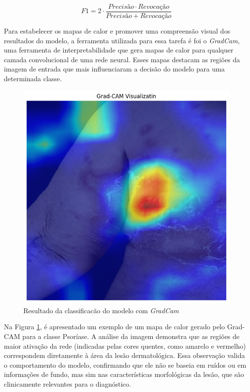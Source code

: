 \begin{equation}
  F1 = 2 \cdot \frac{Precisão \cdot Revocação}{Precisão + Revocação}
  \label{eq:f1_score}
\end{equation}

Para estabelecer os mapas de calor e promover uma compreensão visual dos resultados do modelo, a ferramenta utilizada para essa tarefa é foi o \textit{GradCam}, uma ferramenta de interpretabilidade que gera mapas de calor para qualquer camada convolucional de uma rede neural. Esses mapas destacam as regiões da imagem de entrada que mais influenciaram a decisão do modelo para uma determinada classe.


\begin{figure}[h]
  \begin{center}
    \includegraphics[scale=0.4]{images/test1-compesos.png}
  \end{center}
  \caption{Resultado da classificacão do modelo com \textit{GradCam}}
  \label{fig:gradcam}
\end{figure}


Na Figura \ref{fig:gradcam}, é apresentado um exemplo de um mapa de calor gerado pelo Grad-CAM para a classe Psoríase. A análise da imagem demonstra que as regiões de maior ativação da rede (indicadas pelas cores quentes, como amarelo e vermelho) correspondem diretamente à área da lesão dermatológica. Essa observação valida o comportamento do modelo, confirmando que ele não se baseia em ruídos ou em informações de fundo, mas sim nas características morfológicas da lesão, que são clinicamente relevantes para o diagnóstico.



